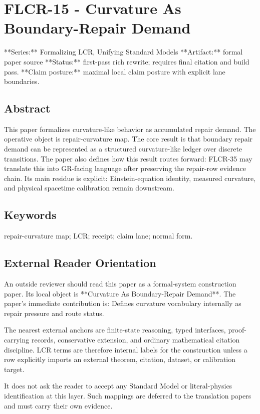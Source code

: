 \documentclass[11pt]{article}
\begin{document}
\section*{FLCR-15 - Curvature As Boundary-Repair Demand}

**Series:** Formalizing LCR, Unifying Standard Models
**Artifact:** formal paper source
**Status:** first-pass rich rewrite; requires final citation and build pass.
**Claim posture:** maximal local claim posture with explicit lane boundaries.

\subsection*{Abstract}

This paper formalizes curvature-like behavior as accumulated repair demand. The operative object is repair-curvature map. The core result is that boundary repair demand can be represented as a structured curvature-like ledger over discrete transitions. The paper also defines how this result routes forward: FLCR-35 may translate this into GR-facing language after preserving the repair-row evidence chain. Its main residue is explicit: Einstein-equation identity, measured curvature, and physical spacetime calibration remain downstream.

\subsection*{Keywords}

repair-curvature map; LCR; receipt; claim lane; normal form.

\subsection*{External Reader Orientation}

An outside reviewer should read this paper as a formal-system construction paper. Its local object is **Curvature As Boundary-Repair Demand**. The paper's immediate contribution is: Defines curvature vocabulary internally as repair pressure and route status.

The nearest external anchors are finite-state reasoning, typed interfaces, proof-carrying records, conservative extension, and ordinary mathematical citation discipline. LCR terms are therefore internal labels for the construction unless a row explicitly imports an external theorem, citation, dataset, or calibration target.

It does not ask the reader to accept any Standard Model or literal-physics identification at this layer. Such mappings are deferred to the translation papers and must carry their own evidence.
\end{document}
